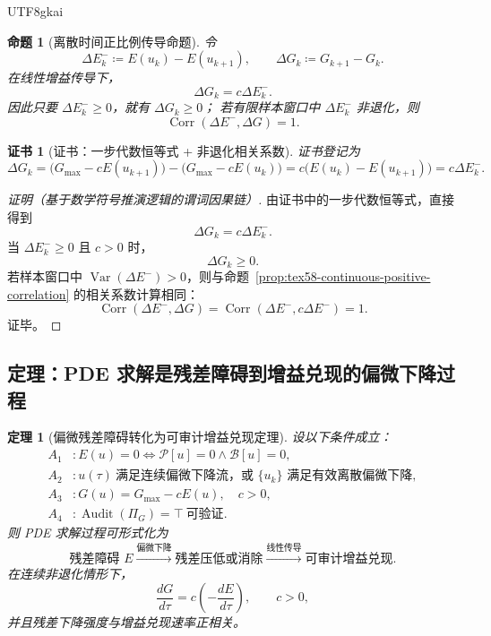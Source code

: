 \documentclass[12pt]{article}
\newtheorem{theorem}{定理}[section]
\newtheorem{proposition}{命题}[section]
\newtheorem{Certificate}{证书}[section]
\newcommand{\DefEq}{\coloneqq}
\newcommand{\Pcal}{\mathcal P}
\newcommand{\Bcal}{\mathcal B}
\DeclareMathOperator{\Audit}{Audit}
\DeclareMathOperator{\Corr}{Corr}
\DeclareMathOperator{\Var}{Var}
\begin{document}
\begin{CJK*}{UTF8}{gkai}
\begin{proposition}[离散时间正比例传导命题]
\label{prop:tex58-discrete-positive-correlation}
令
\[
  \Delta E_k^{-}\DefEq E(u_k)-E(u_{k+1}),
  \qquad
  \Delta G_k\DefEq G_{k+1}-G_k.
\]
在线性增益传导下，
\[
  \Delta G_k=c\Delta E_k^{-}.
\]
因此只要 \(\Delta E_k^{-}\ge0\)，就有 \(\Delta G_k\ge0\)；
若有限样本窗口中 \(\Delta E_k^{-}\) 非退化，则
\[
  \Corr(\Delta E^{-},\Delta G)=1.
\]
\end{proposition}

\begin{Certificate}[证书：一步代数恒等式 + 非退化相关系数]
\label{cert:tex58-discrete-positive-correlation}
证书登记为
\[
  \Delta G_k
  =
  \bigl(G_{\max}-cE(u_{k+1})\bigr)
  -
  \bigl(G_{\max}-cE(u_k)\bigr)
  =
  c\bigl(E(u_k)-E(u_{k+1})\bigr)
  =
  c\Delta E_k^{-}.
\]
\end{Certificate}

\begin{proof}[证明（基于数学符号推演逻辑的谓词因果链）]
由证书中的一步代数恒等式，直接得到
\[
  \Delta G_k=c\Delta E_k^{-}.
\]
当 \(\Delta E_k^{-}\ge0\) 且 \(c>0\) 时，
\[
  \Delta G_k\ge0.
\]
若样本窗口中 \(\Var(\Delta E^{-})>0\)，则与命题~\ref{prop:tex58-continuous-positive-correlation}
的相关系数计算相同：
\[
  \Corr(\Delta E^{-},\Delta G)=\Corr(\Delta E^{-},c\Delta E^{-})=1.
\]
证毕。
\end{proof}

\subsection{定理：PDE 求解是残差障碍到增益兑现的偏微下降过程}
\label{subsec:tex58-main-theorem}

\begin{theorem}[偏微残差障碍转化为可审计增益兑现定理]
\label{thm:tex58-main}
设以下条件成立：
\[
\begin{aligned}
  A_1 &: E(u)=0\Longleftrightarrow \Pcal[u]=0\wedge\Bcal[u]=0,\\
  A_2 &: u(\tau)\ \text{满足连续偏微下降流，或 } \{u_k\}\text{ 满足有效离散偏微下降},\\
  A_3 &: G(u)=G_{\max}-cE(u),\quad c>0,\\
  A_4 &: \Audit(\Pi_G)=\top\ \text{可验证}.
\end{aligned}
\]
则 PDE 求解过程可形式化为
\[
  \boxed{
  \text{残差障碍 }E
  \xrightarrow{\text{偏微下降}}
  \text{残差压低或消除}
  \xrightarrow{\text{线性传导}}
  \text{可审计增益兑现}.
  }
\]
在连续非退化情形下，
\[
  \frac{dG}{d\tau}
  =
  c\left(-\frac{dE}{d\tau}\right),
  \qquad c>0,
\]
并且残差下降强度与增益兑现速率正相关。
\end{theorem}


\end{CJK*}
\end{document}
